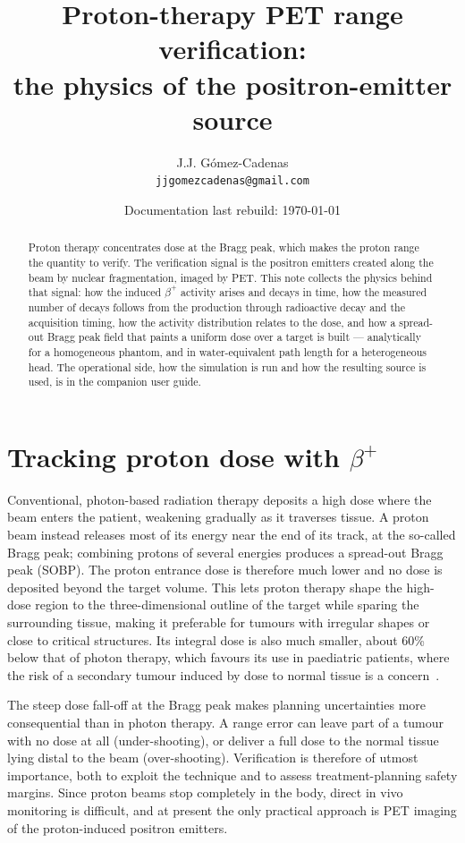 \documentclass[11pt]{article}
\title{Proton-therapy PET range verification:\\
the physics of the positron-emitter source}
\author{J.J. G\'omez-Cadenas\\\texttt{jjgomezcadenas@gmail.com}}
\date{Documentation last rebuild: \today}
\newcommand{\bplus}{\beta^{+}}
\begin{document}
\maketitle

\begin{abstract}
Proton therapy concentrates dose at the Bragg peak, which makes the proton range
the quantity to verify. The verification signal is the positron emitters created
along the beam by nuclear fragmentation, imaged by PET. This note collects the
physics behind that signal: how the induced $\bplus$ activity arises and decays in
time, how the measured number of decays follows from the production through
radioactive decay and the acquisition timing, how the activity distribution
relates to the dose, and how a spread-out Bragg peak field that paints a uniform
dose over a target is built --- analytically for a homogeneous phantom, and in
water-equivalent path length for a heterogeneous head. The operational side, how
the simulation is run and how the resulting source is used, is in the companion
user guide.
\end{abstract}

\section{Tracking proton dose with \texorpdfstring{$\bplus$}{beta+}}
\label{sec:physics-intro}

Conventional, photon-based radiation therapy deposits a high dose where the beam enters the patient, weakening gradually as it traverses tissue. A proton beam instead releases most of its energy near the end of its track, at the so-called Bragg peak; combining protons of several energies produces a spread-out Bragg peak (SOBP). The proton entrance dose is therefore much lower and no dose is deposited beyond the target volume. This lets proton therapy shape the high-dose region to the three-dimensional outline of the target while sparing the surrounding tissue, making it preferable for tumours with irregular shapes or close to critical structures. Its integral dose is also much smaller, about 60\% below that of photon therapy, which favours its use in paediatric patients, where the risk of a secondary tumour induced by dose to normal tissue is a concern~\cite{parodi2023, parodi2024}.

The steep dose fall-off at the Bragg peak makes planning uncertainties more consequential than in photon therapy. A range error can leave part of a tumour with no dose at all (under-shooting), or deliver a full dose to the normal tissue lying distal to the beam (over-shooting). Verification is therefore of utmost importance, both to exploit the technique and to assess treatment-planning safety margins. Since proton beams stop completely in the body, direct in vivo monitoring is difficult, and at present the only practical approach is PET imaging of the proton-induced positron emitters.
\end{document}
